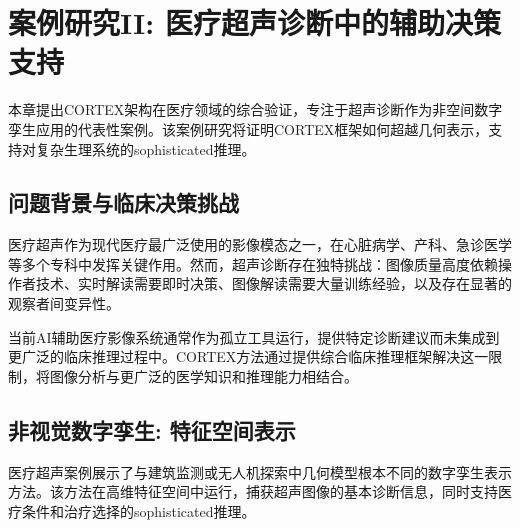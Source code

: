 
\chapter{案例研究II: 医疗超声诊断中的辅助决策支持} \label{chp:medical}

本章提出CORTEX架构在医疗领域的综合验证，专注于超声诊断作为非空间数字孪生应用的代表性案例。该案例研究将证明CORTEX框架如何超越几何表示，支持对复杂生理系统的sophisticated推理。

\section{问题背景与临床决策挑战}

医疗超声作为现代医疗最广泛使用的影像模态之一，在心脏病学、产科、急诊医学等多个专科中发挥关键作用。然而，超声诊断存在独特挑战：图像质量高度依赖操作者技术、实时解读需要即时决策、图像解读需要大量训练经验，以及存在显著的观察者间变异性。

当前AI辅助医疗影像系统通常作为孤立工具运行，提供特定诊断建议而未集成到更广泛的临床推理过程中。CORTEX方法通过提供综合临床推理框架解决这一限制，将图像分析与更广泛的医学知识和推理能力相结合。

\section{非视觉数字孪生: 特征空间表示}

医疗超声案例展示了与建筑监测或无人机探索中几何模型根本不同的数字孪生表示方法。该方法在高维特征空间中运行，捕获超声图像的基本诊断信息，同时支持医疗条件和治疗选择的sophisticated推理。

